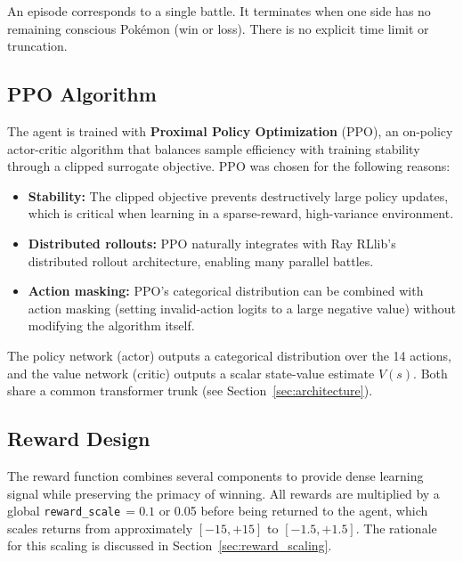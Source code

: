 An episode corresponds to a single battle.  It terminates when one side has no
remaining conscious Pok\'{e}mon (win or loss).  There is no explicit time limit
or truncation.

\subsection{PPO Algorithm}

The agent is trained with \textbf{Proximal Policy Optimization} (PPO), an
on-policy actor-critic algorithm that balances sample efficiency with training
stability through a clipped surrogate objective.  PPO was chosen for the
following reasons:

\begin{itemize}
  \item \textbf{Stability:} The clipped objective prevents destructively large
        policy updates, which is critical when learning in a sparse-reward,
        high-variance environment.
  \item \textbf{Distributed rollouts:} PPO naturally integrates with Ray
        RLlib's distributed rollout architecture, enabling many parallel
        battles.
  \item \textbf{Action masking:} PPO's categorical distribution can be
        combined with action masking (setting invalid-action logits to a large
        negative value) without modifying the algorithm itself.
\end{itemize}

The policy network (actor) outputs a categorical distribution over the 14
actions, and the value network (critic) outputs a scalar state-value estimate
$V(s)$.  Both share a common transformer trunk (see
Section~\ref{sec:architecture}).

\subsection{Reward Design}
\label{sec:reward_design}

The reward function combines several components to provide dense learning signal
while preserving the primacy of winning.  All rewards are multiplied by a
global \texttt{reward\_scale}$\,=0.1$ or 0.05 before being returned to the agent, which
scales returns from approximately $[-15, +15]$ to $[-1.5, +1.5]$.  The
rationale for this scaling is discussed in
Section~\ref{sec:reward_scaling}.

